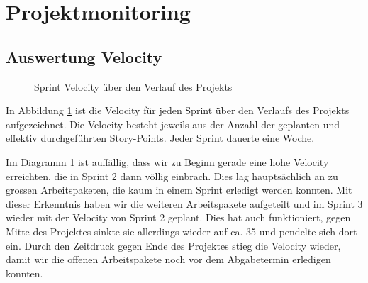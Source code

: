 \section{Projektmonitoring}
\label{sec:Projektmonitoring}

\subsection{Auswertung Velocity}
\label{sub:Auswertung Velocity}

\begin{figure}[H]
    \centering

    \caption[Diagramm Velocity über das Projekt]{Sprint Velocity über den Verlauf des Projekts}
    \label{chart:sprint_velocity}
\end{figure}

In Abbildung \ref{chart:sprint_velocity} ist die Velocity für jeden Sprint über den Verlaufs des Projekts aufgezeichnet. Die Velocity besteht jeweils aus der Anzahl der geplanten und effektiv durchgeführten Story-Points. Jeder Sprint dauerte eine Woche.

Im Diagramm \ref{chart:sprint_velocity} ist auffällig, dass wir zu Beginn gerade eine hohe Velocity erreichten, die in Sprint 2 dann völlig einbrach. Dies lag hauptsächlich an zu grossen Arbeitspaketen, die kaum in einem Sprint erledigt werden konnten. Mit dieser Erkenntnis haben wir die weiteren Arbeitspakete aufgeteilt und im Sprint 3 wieder mit der Velocity von Sprint 2 geplant. Dies hat auch funktioniert, gegen Mitte des Projektes sinkte sie allerdings wieder auf ca. 35 und pendelte sich dort ein. Durch den Zeitdruck gegen Ende des Projektes stieg die Velocity wieder, damit wir die offenen Arbeitspakete noch vor dem Abgabetermin erledigen konnten.


